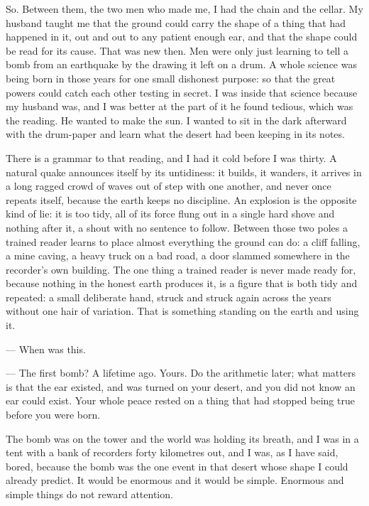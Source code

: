 So. Between them, the two men who made me, I had the chain and the cellar. My husband taught me that the ground could carry the shape of a thing that had happened in it, out and out to any patient enough ear, and that the shape could be read for its cause. That was new then. Men were only just learning to tell a bomb from an earthquake by the drawing it left on a drum. A whole science was being born in those years for one small dishonest purpose: so that the great powers could catch each other testing in secret. I was inside that science because my husband was, and I was better at the part of it he found tedious, which was the reading. He wanted to make the sun. I wanted to sit in the dark afterward with the drum-paper and learn what the desert had been keeping in its notes.\par

There is a grammar to that reading, and I had it cold before I was thirty. A natural quake announces itself by its untidiness: it builds, it wanders, it arrives in a long ragged crowd of waves out of step with one another, and never once repeats itself, because the earth keeps no discipline. An explosion is the opposite kind of lie: it is too tidy, all of its force flung out in a single hard shove and nothing after it, a shout with no sentence to follow. Between those two poles a trained reader learns to place almost everything the ground can do: a cliff falling, a mine caving, a heavy truck on a bad road, a door slammed somewhere in the recorder's own building. The one thing a trained reader is never made ready for, because nothing in the honest earth produces it, is a figure that is both tidy and repeated: a small deliberate hand, struck and struck again across the years without one hair of variation. That is something standing on the earth and using it.\par

\begin{room}

--- When was this.

--- The first bomb? A lifetime ago. Yours. Do the arithmetic later; what matters is that the ear existed, and was turned on your desert, and you did not know an ear could exist. Your whole peace rested on a thing that had stopped being true before you were born.

\end{room}

The bomb was on the tower and the world was holding its breath, and I was in a tent with a bank of recorders forty kilometres out, and I was, as I have said, bored, because the bomb was the one event in that desert whose shape I could already predict. It would be enormous and it would be simple. Enormous and simple things do not reward attention.\par

